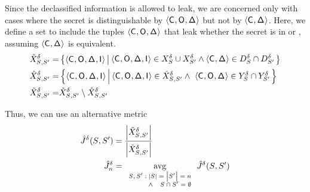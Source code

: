 Since the declassified information is allowed to leak, we are
concerned only with cases where the secret is distinguishable by
$\langle\mathsf{C}_{},\mathsf{O}_{},\mathsf{\Delta}_{}\rangle$ but not by
$\langle\mathsf{C}_{},\mathsf{\Delta}_{}\rangle$. Here, we define a set
\possibleTriplesDiffWithDeclass{\secretsSet{}}{\secretsSetAlt{}} to
include the tuples $\langle\mathsf{C}_{},\mathsf{O}_{},\mathsf{\Delta}_{}\rangle$ that leak
whether the secret is in \secretsSet{} or \secretsSetAlt{}, assuming
$\langle\mathsf{C}_{},\mathsf{\Delta}_{}\rangle$ is equivalent.
\begin{align}
\possibleTriplesUnionWithDeclass{\secretsSet{}}{\secretsSetAlt{}}=& 
\left\{\langle\ACIFn{},\AOOFn{},\DCFn{},\AIIFn{}\rangle
\left|\begin{array}[m]{@{\hspace{0.2em}}r@{}}
 \langle \ACIFn{},\AOOFn{},\DCFn{},\AIIFn{}\rangle \in \possibleTriplesWithDeclass{\secretsSet{}}{}\cup \possibleTriplesWithDeclass{\secretsSetAlt{}}{} 
\wedge\hfill\langle \ACIFn{},\DCFn{}\rangle \in \possibleDeclass{\secretsSet{}}\cap\possibleDeclass{\secretsSetAlt{}}
\end{array}
\right.\right\}\label{eqn:jaccardDeclass:union} \\ 
\possibleTriplesIntersectWithDeclass{\secretsSet{}}{\secretsSetAlt{}}=&
\left\{\langle\ACIFn{},\AOOFn{},\DCFn{},\AIIFn{}\rangle
\left|\begin{array}[m]{@{\hspace{0.2em}}r@{}}
\langle \ACIFn{},\AOOFn{},\DCFn{},\AIIFn{}\rangle \in \possibleTriplesUnionWithDeclass{\secretsSet{}}{\secretsSetAlt{}}
\wedge~\langle \ACIFn{},\AOOFn{}, \DCFn{}\rangle \in \possibleDoubleWithDeclass{\secretsSet{}}\cap\possibleDoubleWithDeclass{\secretsSetAlt{}}
\end{array}
\right.\right\} \label{eqn:jaccardDeclass:intersect}\\ 
\possibleTriplesDiffWithDeclass{\secretsSet{}}{\secretsSetAlt{}}=& \possibleTriplesUnionWithDeclass{\secretsSet{}}{\secretsSetAlt{}}\setminus\possibleTriplesIntersectWithDeclass{\secretsSet{}}{\secretsSetAlt{}} \label{eqn:jaccardDeclass:diff}
\end{align}

Thus, we can use an alternative metric 
\begin{align}
  \JaccardWithDeclass{}(\secretsSet{},\secretsSetAlt{})
  &=\frac{\setSize{\possibleTriplesDiffWithDeclass{\secretsSet{}}{\secretsSetAlt{}}}}{\setSize{\possibleTriplesUnionWithDeclass{\secretsSet{}}{\secretsSetAlt{}}}} \\
  \JaccardWithDeclass{\secretsSetSize}
  &=\avg_{\scriptsize \begin{array}{r@{\hspace{0.25em}}r} \scriptsize \secretsSet{},\secretsSetAlt{}: & \setSize{\secretsSet{}} = \setSize{\secretsSetAlt{}} = \secretsSetSize \\ & \wedge~\hfill \secretsSet{} \cap \secretsSetAlt{} = \emptyset\end{array}}
\JaccardWithDeclass{}(\secretsSet{}, \secretsSetAlt{})
  \label{eqn:jaccardDeclass} 
\end{align}

